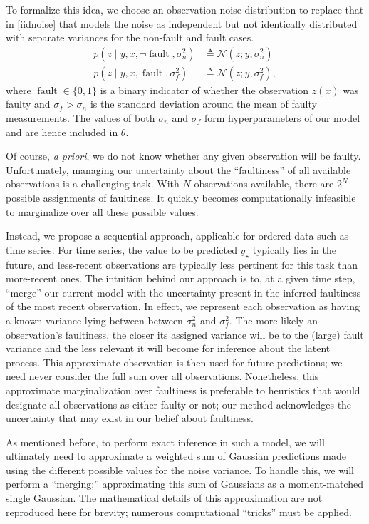 \documentclass{article}
\newcommand{\deq}{\ensuremath{\triangleq}}
\newcommand{\given}{\ensuremath{\mid}}
\newcommand{\cm}[1]{\ensuremath{\mathcal{#1}}}
\newcommand{\st}{_{\star}}
\DeclareMathOperator{\fault}{fault}
\begin{document}
To formalize this idea, we choose an observation noise distribution to
replace that in \eqref{iidnoise} that models the noise as independent
but not identically distributed with separate variances for the
non-fault and fault cases.
\begin{align*}
 p(z \given y, x, \neg\fault, \sigma_n^2)
 &
 \deq
 \cm{N}(z; y, \sigma_n^2)
 \\
 p(z \given y, x, \fault, \sigma_f^2)
 &
 \deq
 \cm{N}(z; y, \sigma_f^2),
\end{align*}
where $\fault \in \lbrace 0, 1 \rbrace$ is a binary indicator of
whether the observation $z(x)$ was faulty and $\sigma_f > \sigma_n$ is
the standard deviation around the mean of faulty measurements.  The
values of both $\sigma_n$ and $\sigma_f$ form hyperparameters of our
model and are hence included in $\theta$.

Of course, {\it a priori}, we do not know whether any given
observation will be faulty.  Unfortunately, managing our uncertainty
about the ``faultiness'' of all available observations is a
challenging task. With $N$ observations available, there are $2^N$
possible assignments of faultiness. It quickly becomes computationally
infeasible to marginalize over all these possible values.

Instead, we propose a sequential approach, applicable for ordered data
such as time series. For time series, the value to be predicted $y\st$
typically lies in the future, and less-recent observations are
typically less pertinent for this task than more-recent ones. The
intuition behind our approach is to, at a given time step, ``merge''
our current model with the uncertainty present in the inferred
faultiness of the most recent observation. In effect, we represent
each observation as having a known variance lying between between
$\sigma_n^2$ and $\sigma_f^2$. The more likely an observation's
faultiness, the closer its assigned variance will be to the (large)
fault variance and the less relevant it will become for inference
about the latent process. This approximate observation is then used
for future predictions; we need never consider the full sum over all
observations. Nonetheless, this approximate marginalization over
faultiness is preferable to heuristics that would designate all
observations as either faulty or not; our method acknowledges the
uncertainty that may exist in our belief about faultiness.

As mentioned before, to perform exact inference in such a model, we
will ultimately need to approximate a weighted sum of Gaussian
predictions made using the different possible values for the noise
variance.  To handle this, we will perform a ``merging;''
approximating this sum of Gaussians as a moment-matched single
Gaussian.  The mathematical details of this approximation are not
reproduced here for brevity; numerous computational ``tricks'' must be
applied.
\end{document}
